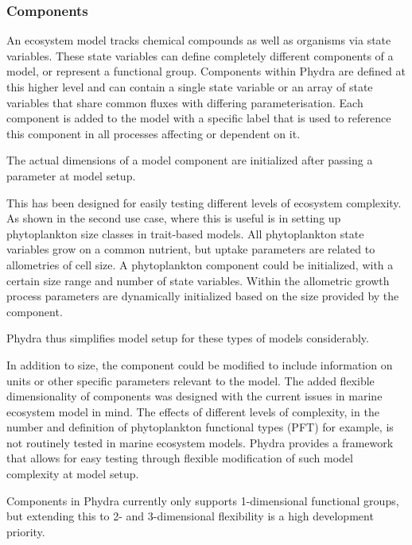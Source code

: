 \documentclass[template.tex]{subfiles}
\begin{document}
\subsubsection{Components}

An ecosystem model tracks chemical compounds as well as organisms via state variables. These state variables can define completely different components of a model, or represent a functional group. Components within Phydra are defined at this higher level and can contain a single state variable or an array of state variables that share common fluxes with differing parameterisation. Each component is added to the model with a specific label that is used to reference this component in all processes affecting or dependent on it. 

The actual dimensions of a model component are initialized after passing a parameter at model setup. 

This has been designed for easily testing different levels of ecosystem complexity. As shown in the second use case, where this is useful is in setting up phytoplankton size classes in trait-based models. All phytoplankton state variables grow on a common nutrient, but uptake parameters are related to allometries of cell size. A phytoplankton component could be initialized, with a certain size range and number of state variables. Within the allometric growth process parameters are dynamically initialized based on the size provided by the component. 

Phydra thus simplifies model setup for these types of models considerably. 

In addition to size, the component could be modified to include information on units or other specific parameters relevant to the model. The added flexible dimensionality of components was designed with the current issues in marine ecosystem model in mind. The effects of different levels of complexity, in the number and definition of phytoplankton functional types (PFT) for example, is not routinely tested in marine ecosystem models. Phydra provides a framework that allows for easy testing through flexible modification of such model complexity at model setup.

Components in Phydra currently only supports 1-dimensional functional groups, but extending this to 2- and 3-dimensional flexibility is a high development priority. 
\end{document}
